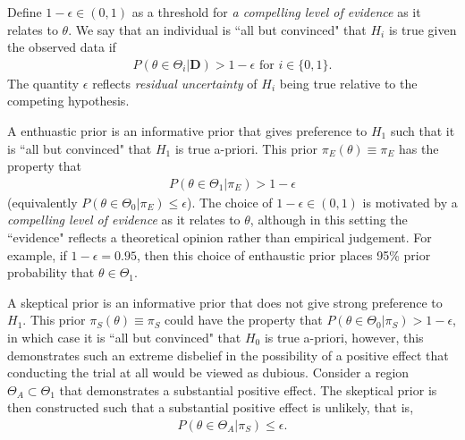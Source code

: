 \documentclass[12pt]{article}
\begin{document}
Define $1-\epsilon\in(0,1)$ as a threshold for \textit{a compelling level of evidence} as it relates to $\theta$. We say that an individual is ``all but convinced" that $H_i$ is true given the observed data if 
\begin{align}
P(\theta\in\Theta_i|\mathbf{D})> 1-\epsilon\text{ for }i\in\{0,1\}.
\end{align}  The quantity $\epsilon$ reflects \textit{residual uncertainty} of $H_i$ being true relative to the competing hypothesis. %


A enthuastic prior is an informative prior that gives preference to $H_1$ such that it is ``all but convinced" that $H_1$ is true a-priori. This prior $\pi_{E}(\theta)\equiv\pi_{E}$ has the property that 
\begin{align}\label{eq:enth_prior}
P(\theta\in\Theta_1| \pi_{E})>1-\epsilon
\end{align} (equivalently $P(\theta\in\Theta_0| \pi_{E})\leq\epsilon$). The choice of $1-\epsilon\in(0,1)$ is motivated by a \textit{compelling level of evidence} as it relates to $\theta$, although in this setting the ``evidence" reflects a theoretical opinion rather than empirical judgement. For example, if $1-\epsilon=0.95$, then this choice of enthaustic prior places 95\% prior probability that $\theta\in\Theta_1$.  

A skeptical prior is an informative prior that does not give strong preference to $H_1$. This prior $\pi_{S}(\theta)\equiv\pi_{S}$ could have the property that $P(\theta\in\Theta_0| \pi_{S})>1-\epsilon$, in which case it is ``all but convinced" that $H_0$ is true a-priori, however, this demonstrates such an extreme disbelief in the possibility of a positive effect that conducting the trial at all would be viewed as dubious. Consider a region $\Theta_A\subset\Theta_1$ that demonstrates a substantial positive effect. The skeptical prior is then constructed such that a substantial positive effect is unlikely, that is, 
\begin{align}\label{eq:skpt_prior}
P(\theta\in\Theta_A| \pi_{S})\leq\epsilon.
\end{align}
\end{document}
